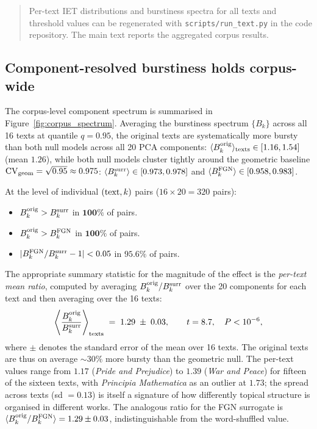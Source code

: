 \documentclass[12pt,a4paper]{article}
\newcommand{\bk}{B_k}
\newcommand{\CV}{\mathrm{CV}}
\begin{document}
\begin{quote}
Per-text IET distributions and burstiness spectra for all texts and
threshold values can be regenerated with \texttt{scripts/run\_text.py}
in the code repository. The main text reports the aggregated corpus
results.
\end{quote}



\subsection{Component-resolved burstiness holds corpus-wide}
\label{sec:corpus_ordering}

The corpus-level component spectrum is summarised in
Figure~\ref{fig:corpus_spectrum}.
Averaging the burstiness spectrum $\{\bk\}$ across all 16 texts
at quantile $q = 0.95$, the original texts are systematically more
bursty than both null models across all 20 PCA components:
$\langle B_k^{\rm orig}\rangle_{\rm texts} \in [1.16, 1.54]$
(mean $1.26$), while both null models cluster tightly around
the geometric baseline $\CV_{\rm geom} = \sqrt{0.95} \approx 0.975$:
$\langle B_k^{\rm surr}\rangle \in [0.973, 0.978]$ and
$\langle B_k^{\rm FGN}\rangle \in [0.958, 0.983]$.

At the level of individual $({\rm text}, k)$ pairs
($16 \times 20 = 320$ pairs):
\begin{itemize}
  \item $B_k^{\rm orig} > B_k^{\rm surr}$ in $\mathbf{100\%}$ of pairs.
  \item $B_k^{\rm orig} > B_k^{\rm FGN}$ in $\mathbf{100\%}$ of pairs.
  \item $|B_k^{\rm FGN}/B_k^{\rm surr} - 1| < 0.05$ in
        $\mathbf{95.6\%}$ of pairs.
\end{itemize}

The appropriate summary statistic for the magnitude of the effect
is the \emph{per-text mean ratio}, computed by averaging
$B_k^{\rm orig}/B_k^{\rm surr}$ over the 20 components for each
text and then averaging over the 16 texts:
\begin{equation}
  \left\langle \frac{B_k^{\rm orig}}{B_k^{\rm surr}}
  \right\rangle_{\rm texts}
  \;=\; 1.29 \;\pm\; 0.03,
  \qquad t = 8.7,\quad P < 10^{-6},
  \label{eq:ratio_corpus}
\end{equation}
where $\pm$ denotes the standard error of the mean over 16 texts.
The original texts are thus on average $\sim 30\%$ more bursty
than the geometric null. The per-text values range from $1.17$
(\emph{Pride and Prejudice}) to $1.39$ (\emph{War and Peace}) for
fifteen of the sixteen texts, with \emph{Principia Mathematica} as
an outlier at $1.73$; the spread across texts (sd $= 0.13$) is
itself a signature of how differently topical structure is organised
in different works.
The analogous ratio for the FGN surrogate is
$\langle B_k^{\rm orig}/B_k^{\rm FGN}\rangle = 1.29 \pm 0.03$,
indistinguishable from the word-shuffled value.
\end{document}
